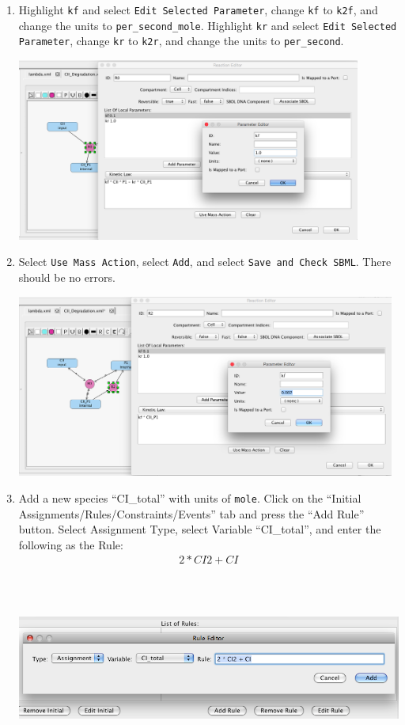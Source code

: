 \documentclass[titlepage,11pt]{article}
\begin{document}
\begin{enumerate}
\item Highlight {\tt kf} and select {\tt Edit Selected Parameter}, change
      {\tt kf} to {\tt k2f}, and change the units to {\tt per\_second\_mole}.
      Highlight {\tt kr} and select {\tt Edit Selected Parameter}, change
      {\tt kr} to {\tt k2r}, and change the units to {\tt per\_second}.

\includegraphics[height=60mm]{screenshots/localParam}

\item Select {\tt Use Mass Action}, select {\tt Add}, 
      and select {\tt Save and Check SBML}.  There should be no errors.

\includegraphics[height=60mm]{screenshots/kineticLaw}

\item Add a new species ``CI\_total'' with units of {\tt mole}.
      Click on the ``Initial Assignments/Rules/Constraints/Events'' tab
      and press the ``Add Rule'' button.
      Select Assignment Type, select Variable ``CI\_total'', 
      and enter the following as the Rule:
\begin{eqnarray*}
& 2 * CI2 + CI &
\end{eqnarray*}

\includegraphics[height=60mm]{screenshots/rule}


\end{enumerate}
\end{document}
